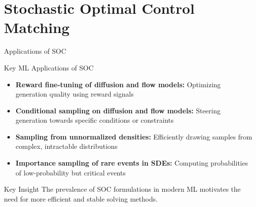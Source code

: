 \documentclass[aspectratio=169,xcolor=dvipsnames]{beamer}
\begin{document}
\section{Stochastic Optimal Control Matching}

\begin{frame}{Applications of SOC}
    
    \begin{block}{Key ML Applications of SOC}
        \begin{itemize}
            \item \textbf{Reward fine-tuning of diffusion and flow models:} Optimizing generation quality using reward signals
            
            \vspace{0.2cm}
            
            \item \textbf{Conditional sampling on diffusion and flow models:} Steering generation towards specific conditions or constraints
            
            \vspace{0.2cm}
            
            \item \textbf{Sampling from unnormalized densities:} Efficiently drawing samples from complex, intractable distributions
            
            \vspace{0.2cm}
            
            \item \textbf{Importance sampling of rare events in SDEs:} Computing probabilities of low-probability but critical events
        \end{itemize}
    \end{block}

    \vspace{-0.1cm}
    
    \begin{alertblock}{Key Insight}
        The prevalence of SOC formulations in modern ML motivates the need for more efficient and stable solving methods.
    \end{alertblock}

\end{frame}
\end{document}
